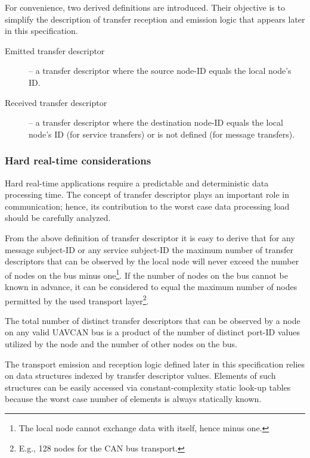 For convenience, two derived definitions are introduced.
Their objective is to simplify the description of transfer reception and emission logic that appears later in this
specification.
\begin{description}
    \item[Emitted transfer descriptor] -- a transfer descriptor where the source node-ID equals the local node's ID.
    \item[Received transfer descriptor] -- a transfer descriptor where the destination node-ID equals
    the local node's ID (for service transfers) or is not defined (for message transfers).
\end{description}

\subsubsection{Hard real-time considerations}

Hard real-time applications require a predictable and deterministic data processing time.
The concept of transfer descriptor plays an important role in communication;
hence, its contribution to the worst case data processing load should be carefully analyzed.

\begin{remark}
    From the above definition of transfer descriptor it is easy to derive that for any
    message subject-ID or any service subject-ID the maximum number of transfer descriptors
    that can be observed by the local node will never exceed the number of nodes on the bus minus
    one\footnote{The local node cannot exchange data with itself, hence minus one.}.
    If the number of nodes on the bus cannot be known in advance, it can be considered to equal the maximum
    number of nodes permitted by the used transport layer\footnote{E.g., 128 nodes for the CAN bus transport.}.

    The total number of distinct transfer descriptors that can be observed by a node on any valid UAVCAN bus
    is a product of the number of distinct port-ID values utilized by the node and the number of other nodes on the bus.

    The transport emission and reception logic defined later in this specification relies on data structures
    indexed by transfer descriptor values.
    Elements of such structures can be easily accessed via constant-complexity static look-up tables
    because the worst case number of elements is always statically known.
\end{remark}

